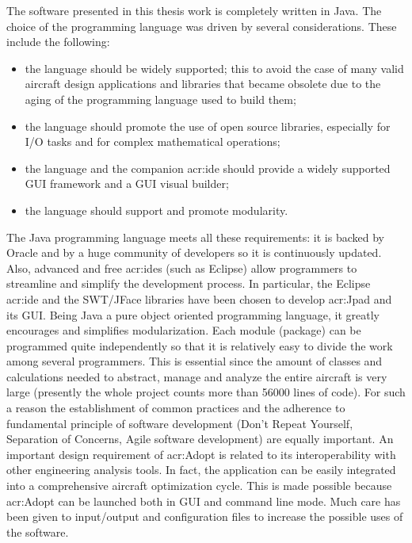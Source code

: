 The software presented in this thesis work is completely written in Java. The choice of the programming language was driven by several considerations. These include the following:

\begin{itemize}
\item the language should be widely supported; this to avoid the case of many valid aircraft design applications and libraries that became obsolete due to the aging of the programming language used to build them;
\item the language should promote the use of open source libraries, especially for I/O tasks and for complex mathematical operations;
\item the language and the companion \gls{acr:ide} should provide a widely supported \gls{GUI} framework and a \gls{GUI} visual builder;
\item  the language should support and promote modularity.
\end{itemize}

The Java programming language meets all these requirements: it is backed by Oracle and by a huge community of developers so it is continuously updated. Also, advanced and free \gls{acr:ide}s (such as Eclipse) allow programmers to streamline and simplify the development process. In particular, the Eclipse \gls{acr:ide} and the SWT/JFace libraries have been chosen to develop \gls{acr:Jpad} and its \gls{GUI}.
Being Java a pure object oriented programming language, it greatly encourages and simplifies modularization. Each module (package) can be programmed quite independently so that it is relatively easy to divide the work among several programmers. This is essential since the amount of classes and calculations needed to abstract, manage and analyze the entire aircraft is very large (presently the whole project counts more than 56000 lines of code). For such a reason the establishment of common practices and the adherence to fundamental principle of software development (Don’t Repeat Yourself, Separation of Concerns, Agile software development) are equally important.
An important design requirement of \gls{acr:Adopt} is related to its interoperability with other engineering analysis tools. In fact, the application can be easily integrated into a comprehensive aircraft optimization cycle. This is made possible because \gls{acr:Adopt} can be launched both in \gls{GUI} and command line mode. Much care has been given to input/output and configuration files to increase the possible uses of the software.\cite{adoptunina}







